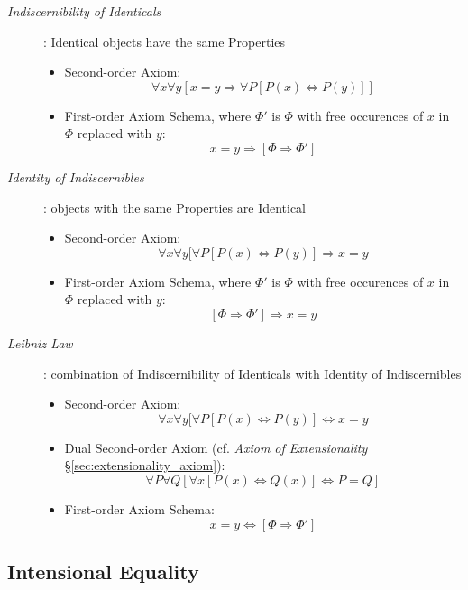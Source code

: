 \begin{description}

\item[\emph{Indiscernibility of Identicals}]: Identical objects have
the same Properties
\begin{itemize}
    \item Second-order Axiom:
    \[
        \forall x \forall y
        [ x = y \Rightarrow \forall P [ P(x) \Leftrightarrow P(y) ]]
    \]
    \item First-order Axiom Schema, where $\Phi'$ is $\Phi$ with free
      occurences of $x$ in $\Phi$ replaced with $y$:
    \[
        x = y \Rightarrow [\Phi \Rightarrow \Phi']
    \]
\end{itemize}

\item[\emph{Identity of Indiscernibles}]: objects with the same Properties
are Identical
\begin{itemize}
    \item Second-order Axiom:
    \[
        \forall x \forall y
        [ \forall P [ P(x) \Leftrightarrow P(y) ] \Rightarrow x = y
    \]
    \item First-order Axiom Schema, where $\Phi'$ is $\Phi$ with free
      occurences of $x$ in $\Phi$ replaced with $y$:
    \[
        [\Phi \Rightarrow \Phi'] \Rightarrow x = y
    \]
\end{itemize}

\item[\emph{Leibniz Law}]: combination of Indiscernibility of
  Identicals with Identity of Indiscernibles
\begin{itemize}
    \item Second-order Axiom:
    \[
        \forall x \forall y
        [ \forall P [ P(x) \Leftrightarrow P(y) ] \Leftrightarrow x = y
    \]
    \item Dual Second-order Axiom (cf. \emph{Axiom of Extensionality}
      \S\ref{sec:extensionality_axiom}):
    \[
        \forall P \forall Q
        [ \forall x [P(x) \Leftrightarrow Q(x)] \Leftrightarrow P = Q ]
    \]
    \item First-order Axiom Schema:
    \[
        x = y \Leftrightarrow [\Phi \Rightarrow \Phi']
    \]
\end{itemize}


\end{description}



\subsection{Intensional Equality}\label{sec:intensional_equality}

